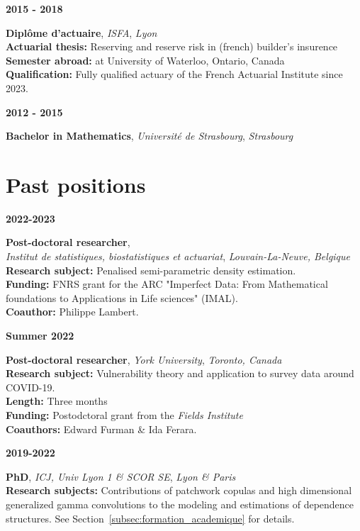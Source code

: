 \documentclass[a4paper,11pt]{article}
\newcommand{\tabcv}[2]{
\begin{minipage}[t]{0.12\linewidth}
\textbf{\footnotesize #1}
\end{minipage}\hfill
\begin{minipage}[t]{0.85\linewidth}
#2
\end{minipage}
\vspace{1em}
}
\newcommand{\bull}[1]{\textbf{#1}}
\begin{document}
\tabcv{2015 - 2018}{
\textbf{Diplôme d'actuaire}, \textit{ISFA}, \textit{Lyon}\\[0.5em]
{\footnotesize 
  \bull{Actuarial thesis:} Reserving and reserve risk in (french) builder's insurence\\
  \bull{Semester abroad:} at University of Waterloo, Ontario, Canada\\
  \bull{Qualification:} Fully qualified actuary of the French Actuarial Institute since 2023. 
}
}

\tabcv{2012 - 2015}{
\textbf{Bachelor in Mathematics}, \textit{Université de Strasbourg}, \textit{Strasbourg}\\[0.5em]
}

\clearpage
\section{Past positions}

\tabcv{2022-2023}{
\textbf{Post-doctoral researcher}, \\
\textit{Institut de statistiques, biostatistiques et actuariat}, \textit{Louvain-La-Neuve, Belgique}\\[0.5em]
{\footnotesize
  \bull{Research subject:} Penalised semi-parametric density estimation.\\
  \bull{Funding:} FNRS grant for the ARC "Imperfect Data:
  From Mathematical foundations to Applications in Life sciences" (IMAL).\\
  \bull{Coauthor:} Philippe Lambert.
}
}


\tabcv{Summer 2022}{
\textbf{Post-doctoral researcher}, \textit{York University}, \textit{Toronto, Canada}\\[0.5em]
{\footnotesize
  \bull{Research subject:} Vulnerability theory and application to survey data around COVID-19. \\
  \bull{Length:} Three months\\
  \bull{Funding:} Postodctoral grant from the \textit{Fields Institute}\\
  \bull{Coauthors:} Edward Furman \& Ida Ferara.
}
}


\tabcv{2019-2022}{
\textbf{PhD}, \textit{ICJ, Univ Lyon 1 \& SCOR SE}, \textit{Lyon \& Paris}\\[0.5em]
{\footnotesize
  \bull{Research subjects:} Contributions of patchwork copulas and high dimensional generalized gamma convolutions to the modeling and estimations of dependence structures. See Section~\ref{subsec:formation_academique} for details.
}
}
\end{document}
